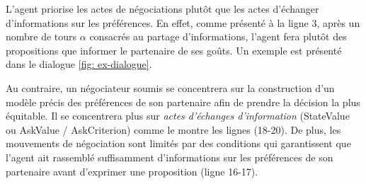 	L'agent priorise les actes de négociations plutôt que les actes d'échanger d'informations sur les préférences. En effet, comme présenté à la ligne 3, après un nombre de tours $ \alpha $ consacrés au partage d'informations, l'agent fera plutôt des propositions que informer le partenaire de ses goûts. Un exemple est présenté dans le dialogue \ref{fig: ex-dialogue}.
	
	Au contraire, un négociateur soumis se concentrera sur la construction d'un modèle précis des préférences de son partenaire afin de prendre la décision la plus équitable. Il se concentrera plus sur \emph {actes d'échanges d'information} (StateValue ou AskValue / AskCriterion) comme le montre les lignes (18-20). De plus, les mouvements de négociation sont limités par des conditions qui garantissent que l'agent ait rassemblé suffisamment d'informations sur les préférences de son partenaire avant d'exprimer une proposition (ligne 16-17).
	
	
	
